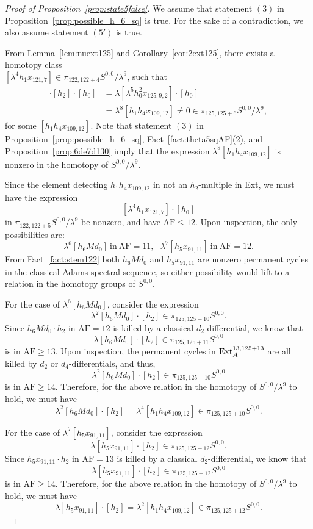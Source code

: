\documentclass{amsart}
\numberwithin{equation}{section}
\newcommand{\AF}{\mathrm{AF}}
\begin{document}
\begin{proof}[Proof of Proposition~\ref{prop:state5false}]
    We assume that statement $(3)$ in Proposition~\ref{prop:possible_h_6_sq} is true. For the sake of a contradiction, we also assume statement $(5')$ is true.

    From Lemma~\ref{lem:nuext125} and Corollary~\ref{cor:2ext125}, there exists a homotopy class\\ $[\lambda^4 h_1 x_{121,7}] \in \pi_{122,122+4}S^{0,0}/\lambda^9$, such that
\begin{align*}
    [\lambda^4 h_1 x_{121,7}] \cdot [h_2] \cdot [h_0] & = \lambda [\lambda^5 h_0^2 x_{125,9,2}] \cdot [h_0] \\
    & = \lambda^8 [h_1h_4x_{109,12}] \neq 0 \in \pi_{125,125+6} S^{0,0}/\lambda^9,
\end{align*} 
    for some $[h_1h_4x_{109,12}]$. Note that statement $(3)$ in Proposition~\ref{prop:possible_h_6_sq}, Fact~\ref{fact:theta5sqAF}(2), and Proposition~\ref{prop:6de7d130} imply that the expression  $\lambda^8 [h_1h_4x_{109,12}]$ is nonzero in the homotopy of $S^{0,0}/\lambda^9$.

Since the element detecting $h_1h_4x_{109,12}$ in not an $h_2$-multiple in Ext, we must have the expression
$$[\lambda^4 h_1 x_{121,7}] \cdot [h_0]$$
in $\pi_{122,122+5} S^{0,0}/\lambda^9$ be nonzero, and have $\AF \le 12$. Upon inspection, the only possibilities are:
$$\lambda^6 [h_6 M d_0] \ \text{in} \ \AF=11,  \ \ \ \lambda^7 [h_5x_{91,11}] \ \text{in} \ \AF=12.$$
From Fact~\ref{fact:stem122} both $h_6 M d_0$ and $h_5x_{91,11}$ are nonzero permanent cycles in the classical Adams spectral sequence, so either possibility would lift to a relation in the homotopy groups of $S^{0,0}$.

For the case of $\lambda^6 [h_6 M d_0]$, consider the expression
$$\lambda^2 [h_6 M d_0] \cdot [h_2] \in \pi_{125, 125+10}S^{0,0}.$$
Since $h_6 M d_0 \cdot h_2$ in $\AF=12$ is killed by a classical $d_2$-differential, we know that 
$$\lambda [h_6 M d_0] \cdot [h_2] \in \pi_{125, 125+11}S^{0,0}$$ 
is in $\AF \ge 13$. Upon inspection, the permanent cycles in $\mathrm{Ext}_A^{13, 125+13}$ are all killed by $d_2$ or $d_4$-differentials, and thus, $$\lambda^2 [h_6 M d_0] \cdot [h_2] \in \pi_{125, 125+10}S^{0,0}$$ 
is in $\AF \ge 14$. Therefore, for the above relation in the homotopy of $S^{0,0}/\lambda^9$ to hold, we must have 
$$\lambda^2 [h_6 M d_0] \cdot [h_2] = \lambda^4 [h_1h_4x_{109,12}] \in \pi_{125, 125+10} S^{0,0}.$$

For the case of $\lambda^7 [h_5x_{91,11}]$, consider the expression
$$\lambda [h_5x_{91,11}] \cdot [h_2] \in \pi_{125, 125+12}S^{0,0}.$$
Since $h_5x_{91,11} \cdot h_2$ in $\AF=13$ is killed by a classical $d_2$-differential, we know that
$$\lambda [h_5x_{91,11}] \cdot [h_2] \in \pi_{125, 125+12}S^{0,0}$$
is in $\AF \ge 14$.
Therefore, for the above relation in the homotopy of $S^{0,0}/\lambda^9$ to hold, we must have
$$\lambda [h_5x_{91,11}] \cdot [h_2] = \lambda^2 [h_1h_4x_{109,12}] \in \pi_{125, 125+12}S^{0,0}.$$


\end{proof}
\end{document}
